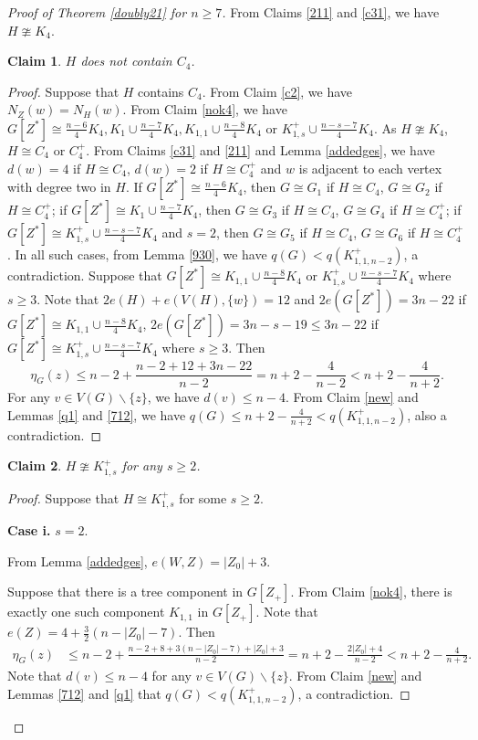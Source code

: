 \documentclass[12pt]{article}
\newtheorem {claim}{Claim}[section]
\begin{document}
\begin{proof}[Proof of Theorem \ref{doubly21} for $n\ge 7$]
From Claims \ref{211} and \ref{c31}, we have $H\ncong K_4$.

\begin{claim}\label{C4}
 $H$ does not contain $C_4$.
\end{claim}

\begin{proof} Suppose that $H$ contains $C_4$.
From Claim \ref{c2}, we have $N_Z(w)=N_{H}(w)$.
From Claim \ref{nok4}, we have $G[Z^*]\cong \frac{n-6}{4}K_4, K_1\cup \frac{n-7}{4}K_4, K_{1,1}\cup \frac{n-8}{4}K_4$ or $K_{1,s}^+\cup \frac{n-s-7}{4}K_4$.
As $H\ncong K_4$, $H\cong C_4$ or $C_4^+$.
From Claims \ref{c31} and \ref{211} and Lemma \ref{addedges}, we have $d(w)=4$ if $H\cong C_4$, $d(w)=2$ if $H\cong C_4^+$ and $w$ is adjacent to each vertex with degree two in $H$.
If $G[Z^*]\cong \frac{n-6}{4}K_4$, then $G\cong G_1$ if $H\cong C_4$, $G\cong G_2$ if $H\cong C_4^+$;
if $G[Z^*]\cong K_1\cup \frac{n-7}{4}K_4$,  then $G\cong G_3$ if $H\cong C_4$, $G\cong G_4$ if $H\cong C_4^+$;
if $G[Z^*]\cong K_{1,s}^+\cup \frac{n-s-7}{4}K_4$ and $s=2$, then $G\cong G_5$ if $H\cong C_4$, $G\cong G_6$ if $H\cong C_4^+$. In all such cases,
from Lemma \ref{930}, we have $q(G)<q(K_{1,1,n-2}^+)$, a contradiction.
Suppose that $G[Z^*]\cong K_{1,1}\cup \frac{n-8}{4}K_4$ or $K_{1,s}^+\cup \frac{n-s-7}{4}K_4$ where $s\ge 3$.
Note that $2e(H)+e(V(H),\{w\})=12$ and $2e(G[Z^*])=3n-22$ if $G[Z^*]\cong K_{1,1}\cup \frac{n-8}{4}K_4$, $2e(G[Z^*])=3n-s-19\le 3n-22$ if $G[Z^*]\cong K_{1,s}^+\cup \frac{n-s-7}{4}K_4$ where $s\ge 3$.
Then
\[
\eta_G(z)\le n-2+\frac{n-2+12+3n-22}{n-2}=n+2-\frac{4}{n-2}<n+2-\frac{4}{n+2}.
\]
For any $v\in V(G)\backslash \{z\}$, we have $d(v)\le n-4$.
From Claim \ref{new} and Lemmas \ref{q1} and \ref{712},  we have $q(G)\le n+2-\frac{4}{n+2}<q(K_{1,1,n-2}^+)$, also a contradiction.
\end{proof}

\begin{claim}\label{k1se}
$H\ncong K_{1,s}^+$ for any $s\ge 2$.
\end{claim}
\begin{proof} Suppose that $H\cong K_{1,s}^+$ for some $s\ge 2$.


\noindent
{\bf Case i.} $s=2$.

From Lemma \ref{addedges}, $e(W,Z)=|Z_0|+3$.


Suppose that there is a tree component in $G[Z_+]$. From Claim \ref{nok4}, there is exactly one such component $K_{1,1}$  in $G[Z_+]$.
Note that $e(Z)=4+\frac{3}{2}(n-|Z_0|-7)$.
Then
\begin{align*}
\eta_G(z)&\le n-2+\frac{n-2+8+3(n-|Z_0|-7)+|Z_0|+3}{n-2}=n+2-\frac{2|Z_0|+4}{n-2}<n+2-\frac{4}{n+2}.
\end{align*}
Note that $d(v)\le n-4$ for any $v\in V(G)\backslash\{z\}$. From Claim \ref{new} and Lemmas \ref{712} and \ref{q1} that $q(G)<q(K_{1,1,n-2}^+)$, a contradiction.


\end{proof}
\end{proof}
\end{document}
